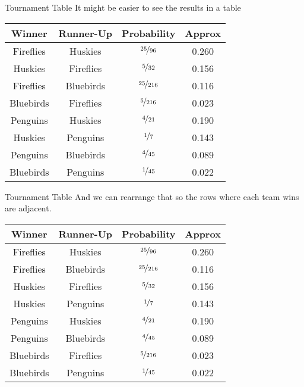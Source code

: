 \documentclass[
  ignorenonframetext,
]{beamer}
\renewcommand{\,}{\text{, }}
\begin{document}
\begin{frame}{Tournament Table}
\protect\hypertarget{tournament-table}{}
It might be easier to see the results in a table

\begin{longtable}[]{@{}cccc@{}}
\toprule
Winner & Runner-Up & Probability & Approx \\
\midrule
\endhead
Fireflies & Huskies & \(\nicefrac{25}{96}\) & 0.260 \\
Huskies & Fireflies & \(\nicefrac{5}{32}\) & 0.156 \\
Fireflies & Bluebirds & \(\nicefrac{25}{216}\) & 0.116 \\
Bluebirds & Fireflies & \(\nicefrac{5}{216}\) & 0.023 \\
Penguins & Huskies & \(\nicefrac{4}{21}\) & 0.190 \\
Huskies & Penguins & \(\nicefrac{1}{7}\) & 0.143 \\
Penguins & Bluebirds & \(\nicefrac{4}{45}\) & 0.089 \\
Bluebirds & Penguins & \(\nicefrac{1}{45}\) & 0.022 \\
\bottomrule
\end{longtable}
\end{frame}

\begin{frame}{Tournament Table}
\protect\hypertarget{tournament-table-1}{}
And we can rearrange that so the rows where each team wins are adjacent.

\begin{longtable}[]{@{}cccc@{}}
\toprule
Winner & Runner-Up & Probability & Approx \\
\midrule
\endhead
Fireflies & Huskies & \(\nicefrac{25}{96}\) & 0.260 \\
Fireflies & Bluebirds & \(\nicefrac{25}{216}\) & 0.116 \\
Huskies & Fireflies & \(\nicefrac{5}{32}\) & 0.156 \\
Huskies & Penguins & \(\nicefrac{1}{7}\) & 0.143 \\
Penguins & Huskies & \(\nicefrac{4}{21}\) & 0.190 \\
Penguins & Bluebirds & \(\nicefrac{4}{45}\) & 0.089 \\
Bluebirds & Fireflies & \(\nicefrac{5}{216}\) & 0.023 \\
Bluebirds & Penguins & \(\nicefrac{1}{45}\) & 0.022 \\
\bottomrule
\end{longtable}
\end{frame}
\end{document}
